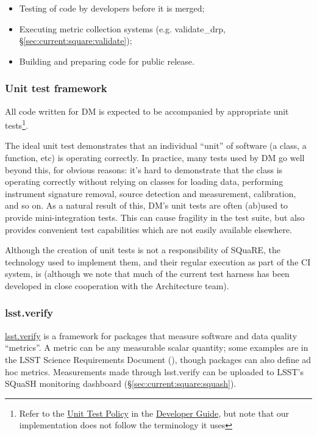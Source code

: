 \documentclass[DM,authoryear,toc,lsstdraft]{lsstdoc}
\begin{document}
\begin{itemize}

  \item{Testing of code by developers before it is merged;}
  \item{Executing metric collection systems (e.g. validate\_drp,
  \S\ref{sec:current:square:validate});}
  \item{Building and preparing code for public release.}

\end{itemize}

\subsubsection{Unit test framework}

All code written for DM is expected to be accompanied by appropriate unit
tests\footnote{Refer to the
\href{https://developer.lsst.io/coding/unit_test_policy.html}{Unit Test
Policy} in the \href{https://developer.lsst.io}{Developer Guide}, but note
that our implementation does not follow the terminology it uses}.

The ideal unit test demonstrates that an individual ``unit'' of software (a
class, a function, etc) is operating correctly. In practice, many tests used
by DM go well beyond this, for obvious reasons: it's hard to demonstrate that
the  class is operating correctly without relying on
classes for loading data, performing instrument signature removal, source
detection and measurement, calibration, and so on. As a natural result of
this, DM's unit tests are often (ab)used to provide mini-integration tests.
This can cause fragility in the test suite, but also provides convenient
test capabilities which are not easily available elsewhere.

Although the creation of unit tests is not a responsibility of SQuaRE, the
technology used to implement them, and their regular execution as part of the
CI system, is (although we note that much of the current test harness has been
developed in close cooperation with the Architecture team).

\subsubsection{lsst.verify}
\label{sec:current:square:verify}


\href{https://github.com/lsst/verify}{lsst.verify} is a framework for packages
that measure software and data quality ``metrics''. A metric can be any
measurable scalar quantity; some examples are in the LSST Science Requirements
Document (), though packages can also define ad hoc metrics.
Measurements made through lsst.verify can be uploaded to LSST's SQuaSH
monitoring dashboard (\S\ref{sec:current:square:squash}).
\end{document}
